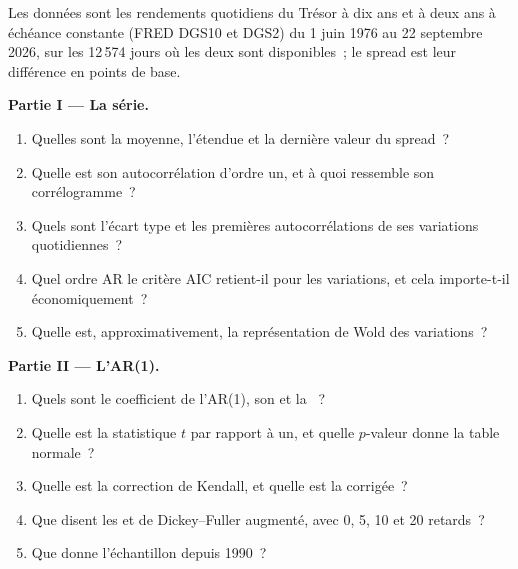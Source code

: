 \begin{problem}\label{pb:qm:linear-time-series:1}
Les données sont les rendements quotidiens du Trésor à dix ans et à deux ans à échéance constante (FRED DGS10 et DGS2) du 1 juin 1976 au 22 septembre 2026, sur les 12\,574
jours où les deux sont disponibles~; le spread est leur différence en points de base.

\medskip\noindent\textbf{Partie I --- La série.}
\begin{enumerate}
\item Quelles sont la moyenne, l'étendue et la dernière valeur du spread~?
\item Quelle est son autocorrélation d'ordre un, et à quoi ressemble son corrélogramme~?
\item Quels sont l'écart type et les premières autocorrélations de ses variations quotidiennes~?
\item Quel ordre AR le critère AIC retient-il pour les variations, et cela importe-t-il économiquement~?
\item Quelle est, approximativement, la représentation de Wold des variations~?
\end{enumerate}

\medskip\noindent\textbf{Partie II --- L'AR(1).}
\begin{enumerate}[resume]
\item Quels sont le coefficient de l'AR(1), son  et la ~?
\item Quelle est la statistique $t$ par rapport à un, et quelle $p$-valeur donne la table normale~?
\item Quelle est la correction de Kendall, et quelle est la  corrigée~?
\item Que disent les  et de Dickey--Fuller augmenté, avec 0, 5, 10 et 20 retards~?
\item Que donne l'échantillon depuis 1990~?
\end{enumerate}


\end{problem}
